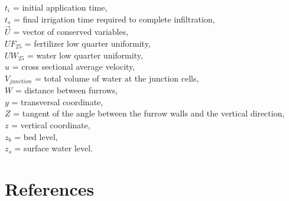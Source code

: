 \documentclass[review,authoryear]{elsarticle}
\begin{document}
$t_i$ = initial application time,\\
$t_s$ = final irrigation time required to complete infiltration,\\
$\vec{U}$ = vector of conserved variables,\\
$UF_{25}$ = fertilizer low quarter uniformity,\\
$UW_{25}$ = water low quarter uniformity,\\
$u$ = cross sectional average velocity,\\
$V_{junction}$ = total volume of water at the junction cells,\\
$W$ = distance between furrows,\\
$y$ = transversal coordinate,\\
$Z$ = tangent of the angle between the furrow walls and the vertical direction,
\\
$z$ = vertical coordinate,\\
$z_b$ = bed level,\\
$z_s$ = surface water level.

\section*{References}

\end{document}

